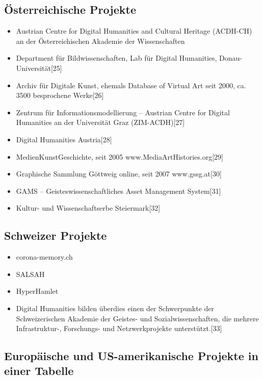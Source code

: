 \documentclass{article}
\begin{document}
\subsection{Österreichische Projekte}
\begin{itemize}
\item Austrian Centre for Digital Humanities and Cultural Heritage (ACDH-CH) an der Österreichischen Akademie der Wissenschaften
\item Department für Bildwissenschaften, Lab für Digital Humanities, Donau-Universität[25]
\item Archiv für Digitale Kunst, ehemals Database of Virtual Art seit 2000, ca. 3500 besprochene Werke[26]
\item Zentrum für Informationsmodellierung – Austrian Centre for Digital Humanities an der Universität Graz (ZIM-ACDH)[27]
\item Digital Humanities Austria[28]
\item MedienKunstGeschichte, seit 2005 www.MediaArtHistories.org[29]
\item Graphische Sammlung Göttweig online, seit 2007 www.gssg.at[30]
\item GAMS – Geisteswissenschaftliches Asset Management System[31]
\item Kultur- und Wissenschaftserbe Steiermark[32]
\end{itemize}


\subsection{Schweizer Projekte}
\begin{itemize}
\item corona-memory.ch
\item SALSAH
\item HyperHamlet
\item Digital Humanities bilden überdies einen der Schwerpunkte der Schweizerischen Akademie der Geistes- und Sozialwissenschaften, die mehrere Infrastruktur-, Forschungs- und Netzwerkprojekte unterstützt.[33]
\end{itemize}


\subsection{Europäische und US-amerikanische Projekte in einer Tabelle}
\end{document}
